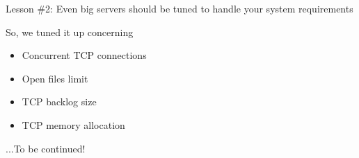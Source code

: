 \documentclass[utf8]{beamer}
\begin{document}
\begin{frame}
Lesson \#2: Even big servers should be tuned to handle your system requirements
\end{frame}

\begin{frame}
So, we tuned it up concerning
\begin{itemize}
	\item<+-> Concurrent TCP connections
	\item<+-> Open files limit
	\item<+-> TCP backlog size
	\item<+-> TCP memory allocation
\end{itemize}
\end{frame}

...To be continued!
\end{document}
